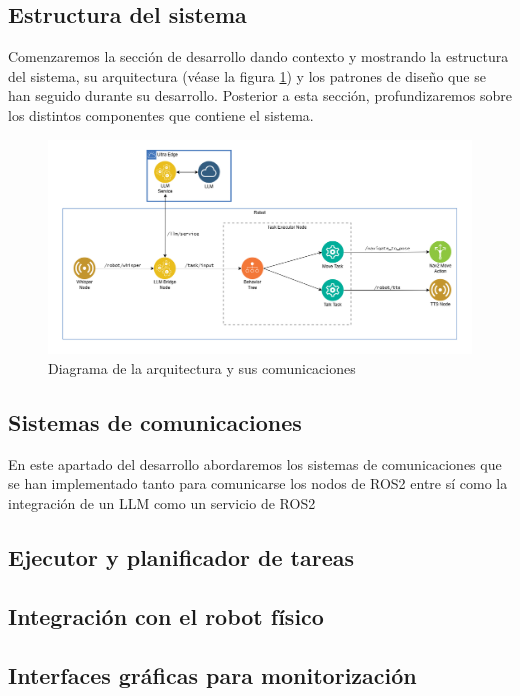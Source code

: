 \documentclass[../main.tex]{subfiles}
\begin{document}
\subsection{Estructura del sistema}
Comenzaremos la sección de desarrollo dando contexto y mostrando la estructura del sistema, su arquitectura (véase la figura \ref{fig:architecture_diagram}) y los patrones de diseño que se han seguido durante su desarrollo. Posterior a esta
sección, profundizaremos sobre los distintos componentes que contiene el sistema.

\begin{figure}[H]
\centering
\includegraphics[width=\textwidth]{images/architecture.png}
\caption{Diagrama de la arquitectura y sus comunicaciones}\label{fig:architecture_diagram}
\end{figure}

\subsection{Sistemas de comunicaciones}
En este apartado del desarrollo abordaremos los sistemas de comunicaciones que se han implementado tanto para comunicarse los nodos de ROS2 entre sí como la integración
de un LLM como un servicio de ROS2

\blindtext

\subsection{Ejecutor y planificador de tareas}
\blindtext

\subsection{Integración con el robot físico}
\blindtext

\subsection{Interfaces gráficas para monitorización}
\blindtext
\end{document}
